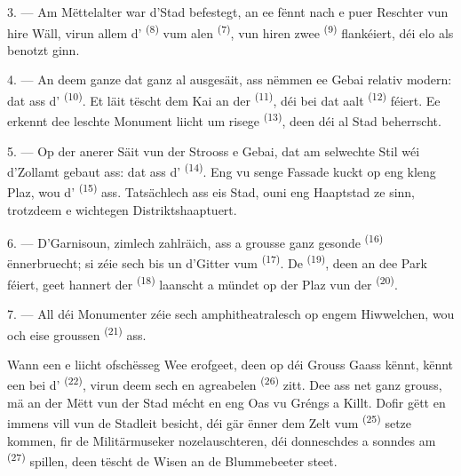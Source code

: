 3. --- Am Mëttelalter war d'Stad befestegt, an ee fënnt nach e puer Reschter vun
hire Wäll, virun allem d' \textsuperscript{(8)} vum alen
 \textsuperscript{(7)}, vun hiren zwee 
\textsuperscript{(9)} flankéiert, déi elo als  benotzt ginn.

4. --- An deem ganze  dat ganz al ausgesäit, ass nëmmen ee Gebai
relativ modern: dat ass d' \textsuperscript{(10)}. Et läit tëscht dem
Kai an der  \textsuperscript{(11)}, déi bei dat aalt
 \textsuperscript{(12)} féiert. Ee erkennt dee leschte Monument
liicht um risege  \textsuperscript{(13)}, deen déi al Stad
beherrscht.

5. --- Op der anerer Säit vun der Strooss  e Gebai, dat am selwechte
Stil wéi d'Zollamt gebaut ass: dat ass d' \textsuperscript{(14)}. Eng
vu senge Fassade kuckt op eng kleng Plaz, wou d'
\textsuperscript{(15)} ass. Tatsächlech ass eis Stad, ouni eng Haaptstad ze sinn,
trotzdeem e wichtegen Distriktshaaptuert.

\VUsaut{5.0mm}
\VUsaut{3.4mm}

6. --- D'Garnisoun, zimlech zahlräich, ass a grousse ganz gesonde 
\textsuperscript{(16)} ënnerbruecht; si zéie sech bis un d'Gitter vum
 \textsuperscript{(17)}. De 
\textsuperscript{(19)}, deen an dee Park féiert, geet hannert der
 \textsuperscript{(18)} laanscht a mündet op der Plaz vun der
 \textsuperscript{(20)}.

7. --- All déi Monumenter zéie sech amphitheatralesch op engem Hiwwelchen, wou och
eise groussen  \textsuperscript{(21)} ass.

Wann een e liicht ofschësseg Wee erofgeet, deen op déi Grouss Gaass kënnt, kënnt een
bei d' \textsuperscript{(22)}, virun deem sech en agreabelen
 \textsuperscript{(26)} zitt. Dee  ass
net ganz grouss, mä an der Mëtt vun der Stad mécht en eng Oas vu Gréngs a Killt.
Dofir gëtt en immens vill vun de Stadleit besicht, déi gär ënner dem Zelt vum
 \textsuperscript{(25)} setze kommen, fir de Militärmuseker
nozelauschteren, déi donneschdes a sonndes am  \textsuperscript{(27)}
spillen, deen tëscht de Wisen an de Blummebeeter steet.


